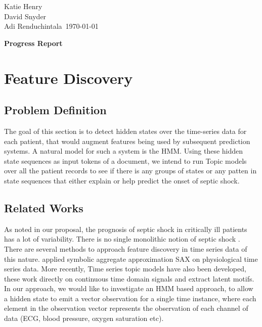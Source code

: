 \documentclass[12pt,solutions]{article}
\newcommand{\prof}{Katie Henry \\ David Snyder \\ Adi Renduchintala}
\newcommand{\topic}{MLCD Project}
\newlength{\toppush}
\newcommand{\htitle} 
{
    \noindent\vspace*{-\toppush}\newline\parbox{6.5in}
    {
        \vspace{-.85cm}
        \prof\hfill \ 
	 \today
	\vspace*{-.5ex}\newline
        \mbox{}\hrulefill\mbox{}
    }
    \vspace*{1ex}\mbox{}\newline
    \begin{center}{
        \large\bf{Progress Report} }\end{center}
}
\newcommand{\handout}
{
    \thispagestyle{empty}
    \markboth{\topic}{\topic}
    \pagestyle{myheadings}
    \htitle
}
\begin{document}
\handout

\setlength{\parindent}{0pt}


\setcounter{section}{0}
\section{Feature Discovery}
\subsection{Problem Definition}
The goal of this section is to detect hidden states over the time-series data for each patient, that would augment features being used by subsequent prediction systems. A natural model for such a system is the HMM. Using these hidden state sequences as input tokens of a document, we intend to run Topic models over all the patient records to see if there is any groups of states or any patten in state sequences that either explain or help predict the onset of septic shock.
\subsection{Related Works}
As noted in our proposal, the prognosis of septic shock in critically ill patients has a lot of variability. There is no single monolithic notion of septic shock \cite{Shavdia2007} . There are several methods to approach feature discovery in time series data of this nature. \cite{Esbroeck2012hrt}  applied symbolic aggregate approximation SAX \cite{Lin2003sax} on physiological time series data. More recently, Time series topic models have also been developed, \cite{SariaThesis2011} these work directly on continuous time domain signals and extract latent motifs. In our approach, we would like to investigate an HMM based approach, to allow a hidden state to emit a vector observation for a single time instance, where each element in the observation vector represents the observation of each channel of data (ECG, blood pressure, oxygen saturation etc).
\end{document}
